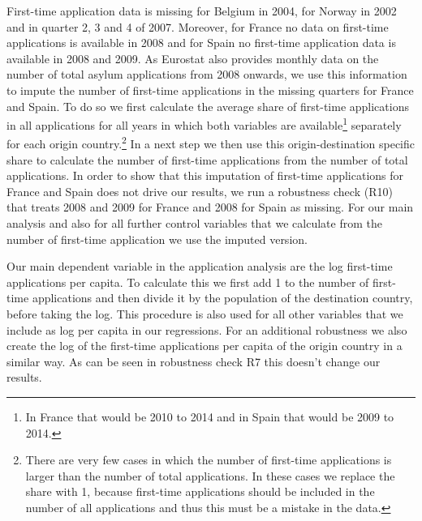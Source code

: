 \documentclass[11pt,a4paper]{scrartcl}
\begin{document}
First-time application data is missing for Belgium in 2004, for Norway in 2002 and in quarter 2, 3 and 4 of 2007. Moreover, for France no data on first-time applications is available in 2008 and for Spain no first-time application data is available in 2008 and 2009. As Eurostat also provides monthly data on the number of total asylum applications from 2008 onwards, we use this information to impute the number of first-time applications in the missing quarters for France and Spain. To do so we first calculate the average share of first-time applications in all applications for all years in which both variables are available\footnote{In France that would be 2010 to 2014 and in Spain that would be 2009 to 2014.} separately for each origin country.\footnote{There are very few cases in which the number of first-time applications is larger than the number of total applications. In these cases we replace the share with 1, because first-time applications should be included in the number of all applications and thus this must be a mistake in the data.} In a next step we then use this origin-destination specific share to calculate the number of first-time applications from the number of total applications. In order to show that this imputation of first-time applications for France and Spain does not drive our results, we run a robustness check (R10) that treats 2008 and 2009 for France and 2008 for Spain as missing. For our main analysis and also for all further control variables that we calculate from the number of first-time application we use the imputed version. 



Our main dependent variable in the application analysis are the log first-time applications per capita. To calculate this we first add 1 to the number of first-time applications and then divide it by the population of the destination country, before taking the log. This procedure is also used for all other variables that we include as log per capita in our regressions. For an additional robustness we also create the log of the first-time applications per capita of the origin country in a similar way. As can be seen in robustness check R7 this doesn't change our results.
\end{document}
